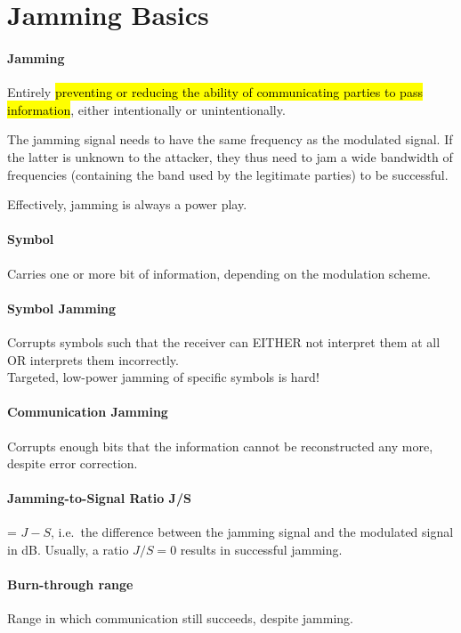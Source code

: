  \section{Jamming Basics}

\paragraph{Jamming}
Entirely \hl{preventing or reducing the ability of communicating parties to pass information}, either intentionally or unintentionally.

The jamming signal needs to have the same frequency as the modulated signal.
If the latter is unknown to the attacker, they thus need to jam a wide bandwidth of frequencies (containing the band used by the legitimate parties) to be successful.

Effectively, jamming is always a power play.

\paragraph{Symbol}
Carries one or more bit of information, depending on the modulation scheme.

\paragraph{Symbol Jamming}
Corrupts symbols such that the receiver can EITHER not interpret them at all OR interprets them incorrectly.\\
Targeted, low-power jamming of specific symbols is hard!

\paragraph{Communication Jamming}
Corrupts enough bits that the information cannot be reconstructed any more, despite error correction.

\paragraph{Jamming-to-Signal Ratio J/S} = $J -  S$, i.e.\ the difference between the jamming signal and the modulated signal in dB.
Usually, a ratio $J/S = 0$ results in successful jamming.

\paragraph{Burn-through range}
Range in which communication still succeeds, despite jamming.

